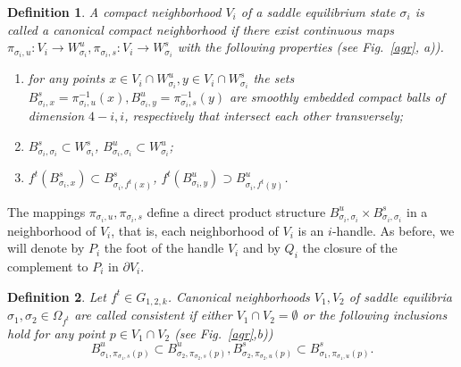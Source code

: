 \documentclass[%
 aip,
 amsmath,amssymb,
preprint,%
]{revtex4-1}
\newtheorem{definition}{Definition}
\begin{document}
\begin{definition}\label{can} A compact neighborhood $V_i$ of a saddle equilibrium state $\sigma_i$ is called a {\it canonical compact neighborhood} if
there exist continuous maps $\pi_{\sigma_i,u}: V_{i}\to W^u_{\sigma_i}, \pi_{\sigma_i,s}: V_{i}\to W^s_{\sigma_i}$ with the following properties (see Fig.~\ref{agr}, a)).

\begin{enumerate}
\item for any points $x\in V_{i}\cap W^u_{\sigma_i}, y\in V_{i}\cap W^s_{\sigma_i}$ the sets $B^s_{\sigma_i,x}=\pi_{\sigma_i,u}^{-1}(x), B^u_{\sigma_i,y}=\pi_{\sigma_i,s}^{-1}(y)$ are smoothly embedded compact balls of dimension $4-i, i$, respectively that intersect each other  transversely;
\item $B^s_{\sigma_i,\sigma_i}\subset W^s_{\sigma_i}$, $B^u_{\sigma_i,\sigma_i}\subset W^u_{\sigma_i}$;
\item $f^{t}(B^s_{\sigma_i,x})\subset B^s_{\sigma_i,f^{t}(x)}$, $f^{t}(B^u_{\sigma_i,y})\supset B^u_{\sigma_i,f^{t}(y)}$.
\end{enumerate}
\end{definition}

The mappings $\pi_{\sigma_i,u}, \pi_{\sigma_i,s}$ define a direct product structure $B^{u}_{\sigma_i, \sigma_i}\times B^s_{\sigma_i, \sigma_i}$ in a neighborhood of $V_{i}$, that is, each neighborhood of $V_i$ is an $i$-handle. As before, we will denote by $P_i$ the foot of the handle $V_i$ and by $Q_i$ the closure of the complement to  $P_i$ in $\partial V_i$.

\begin{definition} Let $f^t\in G_{1,2,k}$. Canonical neighborhoods $V_1, V_2$ of saddle equilibria $\sigma_1, \sigma_2\in \Omega_{f^t}$ are called consistent if either $V_1\cap V_2=\emptyset$ or the following inclusions hold for any point $p\in V_1\cap V_2$ (see Fig.~\ref{agr},b))
$$B^u_{\sigma_1, \pi_{\sigma_1,s}(p)}\subset B^u_{\sigma_2, \pi_{\sigma_2,s}(p)}, B^s_{\sigma_2, \pi_{\sigma_2,u}(p)}\subset B^s_{\sigma_1, \pi_{\sigma_1,u}(p)}.$$
\end{definition}
\end{document}
